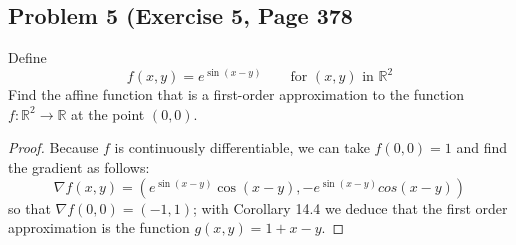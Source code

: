 \documentclass{article}
\begin{document}
\subsection*{Problem 5 (Exercise 5, Page 378}
Define 
\[ f(x, y) = e^{\sin(x-y)} \qquad \text{for $(x, y)$ in $\mathbb{R}^2$}\]
Find the affine function that is a first-order approximation to the function $f \colon \mathbb{R}^2 \to \mathbb{R}$ at the point $(0, 0)$.
\begin{proof}
Because $f$ is continuously differentiable, we can take $f(0, 0) = 1$ and find the gradient as follows: 
\[ \nabla f(x, y) = \left( e^{\sin(x-y)}\cos(x-y), -e^{\sin(x-y)}cos(x-y)\right)\]
so that $\nabla f (0, 0) = (-1, 1)$; with Corollary 14.4 we deduce that the first order approximation is the function $g(x, y) = 1 + x - y$.
\end{proof}
\end{document}
